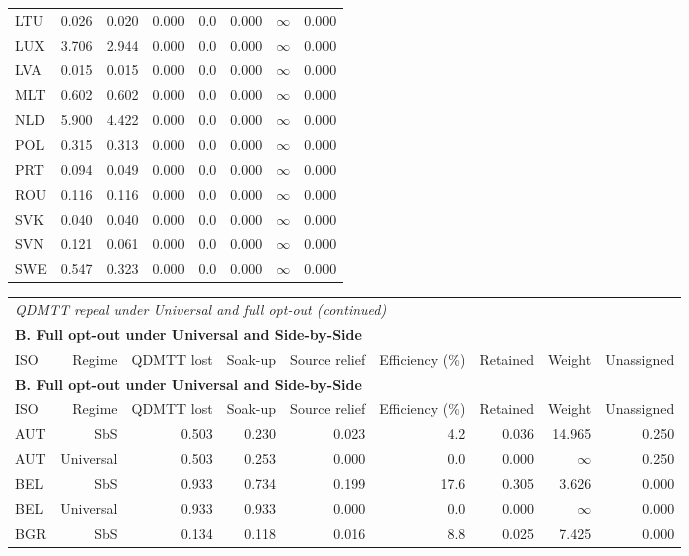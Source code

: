 {\begin{longtable}{@{}lrrrrrrr@{}}
LTU & 0.026 & 0.020 & 0.000 &  0.0 & 0.000 & $\infty$ & 0.000 \\
LUX & 3.706 & 2.944 & 0.000 &  0.0 & 0.000 & $\infty$ & 0.000 \\
LVA & 0.015 & 0.015 & 0.000 &  0.0 & 0.000 & $\infty$ & 0.000 \\
MLT & 0.602 & 0.602 & 0.000 &  0.0 & 0.000 & $\infty$ & 0.000 \\
NLD & 5.900 & 4.422 & 0.000 &  0.0 & 0.000 & $\infty$ & 0.000 \\
POL & 0.315 & 0.313 & 0.000 &  0.0 & 0.000 & $\infty$ & 0.000 \\
PRT & 0.094 & 0.049 & 0.000 &  0.0 & 0.000 & $\infty$ & 0.000 \\
ROU & 0.116 & 0.116 & 0.000 &  0.0 & 0.000 & $\infty$ & 0.000 \\
SVK & 0.040 & 0.040 & 0.000 &  0.0 & 0.000 & $\infty$ & 0.000 \\
SVN & 0.121 & 0.061 & 0.000 &  0.0 & 0.000 & $\infty$ & 0.000 \\
SWE & 0.547 & 0.323 & 0.000 &  0.0 & 0.000 & $\infty$ & 0.000 \\
\end{longtable}
\addtocounter{table}{-1}
\begin{longtable}{@{}lrrrrrrrr@{}}
\multicolumn{9}{l}{\textit{QDMTT repeal under Universal and full opt-out (continued)}} \\
\multicolumn{9}{l}{\textbf{B. Full opt-out under Universal and Side-by-Side}} \\
\toprule
ISO & Regime & QDMTT lost & Soak-up & Source relief & Efficiency (\%) & Retained & Weight & Unassigned \\
\midrule
\endfirsthead
\multicolumn{9}{l}{\textbf{B. Full opt-out under Universal and Side-by-Side}} \\
\toprule
ISO & Regime & QDMTT lost & Soak-up & Source relief & Efficiency (\%) & Retained & Weight & Unassigned \\
\midrule
\endhead
\midrule
\endfoot
\bottomrule
\endlastfoot
AUT & SbS & 0.503 & 0.230 & 0.023 &  4.2 & 0.036 & 14.965 & 0.250 \\
AUT & Universal & 0.503 & 0.253 & 0.000 &  0.0 & 0.000 & $\infty$ & 0.250 \\
BEL & SbS & 0.933 & 0.734 & 0.199 & 17.6 & 0.305 &  3.626 & 0.000 \\
BEL & Universal & 0.933 & 0.933 & 0.000 &  0.0 & 0.000 & $\infty$ & 0.000 \\
BGR & SbS & 0.134 & 0.118 & 0.016 &  8.8 & 0.025 &  7.425 & 0.000 \\

\end{longtable}}
